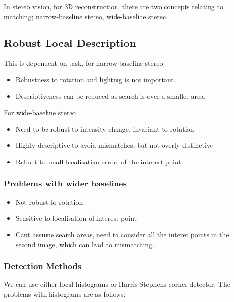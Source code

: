 In stereo vision, for 3D reconstruction, there are two concepts relating to matching; narrow-baseline stereo, wide-baseline stereo.

\subsection{Robust Local Description}

This is dependent on task, for narrow baseline stereo:

\begin{itemize}
    \itemsep0em
    \item Robustness to rotation and lighting is not important.
    \item Descriptiveness can be reduced as search is over a smaller area.
\end{itemize}

\noindent For wide-baseline stereo

\begin{itemize}
    \itemsep0em
    \item Need to be robust to intensity change, invariant to rotation
    \item Highly descriptive to avoid mismatches, but not overly distinctive
    \item Robust to small localisation errors of the interest point.
\end{itemize}

\subsubsection{Problems with wider baselines}
\begin{itemize}
    \itemsep0em
    \item Not robust to rotation
    \item Sensitive to localisation of interest point
    \item Cant assume search areas, need to consider all the interet points in the second image, which can lead to mismatching.
\end{itemize}

\subsubsection{Detection Methods}

We can use either local histograms or Harris Stephens corner detector. The problems with histograms are as follows:

